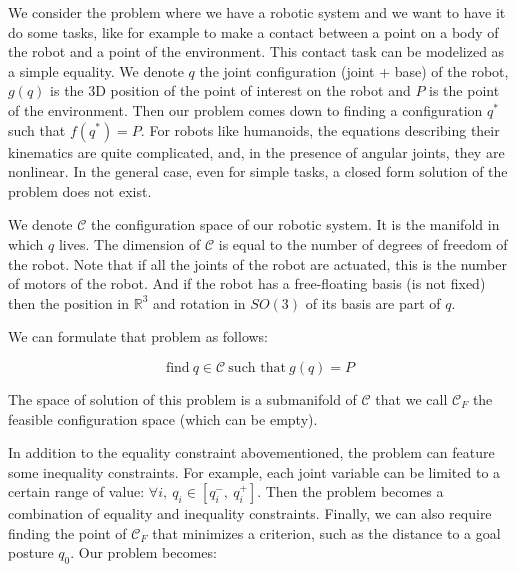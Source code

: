We consider the problem where we have a robotic system and we want to have it do some tasks, like for example to make a contact between a point on a body of the robot and a point of the environment.
This contact task can be modelized as a simple equality.
We denote $q$ the joint configuration (joint + base) of the robot, $g(q)$ is the 3D position of the point of interest on the robot and $P$ is the point of the environment.
Then our problem comes down to finding a configuration $q^*$ such that $f(q^*) = P$.
For robots like humanoids, the equations describing their kinematics are quite complicated, and, in the presence of angular joints, they are nonlinear.
In the general case, even for simple tasks, a closed form solution of the problem does not exist.

We denote $\mathcal{C}$ the configuration space of our robotic system.
It is the manifold in which $q$ lives. The dimension of $\mathcal{C}$ is equal to the number of degrees of freedom of the robot.
Note that if all the joints of the robot are actuated, this is the number of motors of the robot.
And if the robot has a free-floating basis (is not fixed) then the position in $\mathbb{R}^3$ and rotation in $SO(3)$ of its basis are part of $q$.

We can formulate that problem as follows:

\begin{equation}
  \text{find}\ q\in\mathcal{C}\ \text{such that}\ g(q)=P
\end{equation}

The space of solution of this problem is a submanifold of $\mathcal{C}$ that we call ${\mathcal{C}}_F$ the feasible configuration space (which can be empty).

In addition to the equality constraint abovementioned, the problem can feature some inequality constraints.
For example, each joint variable can be limited to a certain range of value: $\forall i,\ q_i\in [q_i^-,\ q_i^+]$. Then the problem becomes a combination of equality and inequality constraints.%
Finally, we can also require finding the point of $\mathcal{C}_F$ that minimizes a criterion, such as the distance to a goal posture $q_0$.
Our problem becomes:

